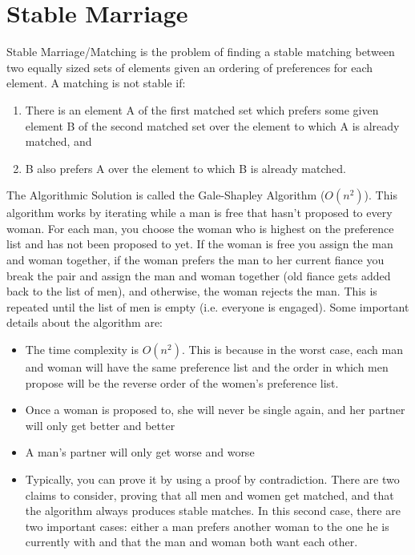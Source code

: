 \documentclass{article}
\begin{document}
\section{Stable Marriage}
Stable Marriage/Matching is the problem of finding a stable matching between two equally sized sets of elements given an ordering of preferences for each element.  
A matching is not stable if: 

\begin{enumerate}
    \item There is an element A of the first matched set which prefers some given element B of the second matched set over the element to which A is already matched, and
    \item B also prefers A over the element to which B is already matched.
\end{enumerate}

The Algorithmic Solution is called the Gale-Shapley Algorithm ($O(n^2)$). This algorithm works by
iterating while a man is free that hasn't proposed to every woman. For each man, you choose the
woman who is highest on the preference list and has not been proposed to yet. If the woman is free
you assign the man and woman together, if the woman prefers the man to her current fiance you break
the pair and assign the man and woman together (old fiance gets added back to the list of men), and otherwise, the woman rejects the man. 
This is repeated until the list of men is empty (i.e. everyone is engaged). Some important details about the algorithm are:

\begin{itemize}
    \item The time complexity is $O(n^2)$. This is because in the worst case, each man and woman will have the same preference list and the order in which men propose will be the reverse order of the women's preference list.
    \item Once a woman is proposed to, she will never be single again, and her partner will only get better and better
    \item A man's partner will only get worse and worse
    \item Typically, you can prove it by using a proof by contradiction. There are two claims to
      consider, proving that all men and women get matched, and that the algorithm always produces
      stable matches. In this second case, there are two important cases: either a man prefers
      another woman to the one he is currently with and that the man and woman both want each other.
\end{itemize}
\end{document}
